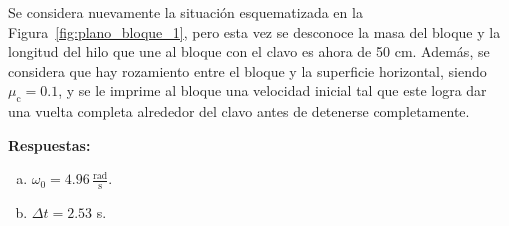 \documentclass[addpoints]{exam}
\newcommand{\rtas}{\textbf{Respuestas: }}
\begin{document}
\begin{questions}

    \question Se considera nuevamente la situación esquematizada en la Figura~\ref{fig:plano_bloque_1}, pero esta vez se desconoce la masa del bloque y la longitud del hilo que une al bloque con el clavo es ahora de 50 cm. Además, se considera que hay rozamiento entre el bloque y la superficie horizontal, siendo $\mu_\text{c} = 0.1$, y se le imprime al bloque una velocidad inicial tal que este logra dar una vuelta completa alrededor del clavo antes de detenerse completamente.

    \rtas
    \begin{enumerate}[a)]
        \item $\omega_0 = 4.96 \, \frac{\text{rad}}{\text{s}}$.
        \item $\Delta t = 2.53$ s.
    \end{enumerate}

\end{questions}
\end{document}
